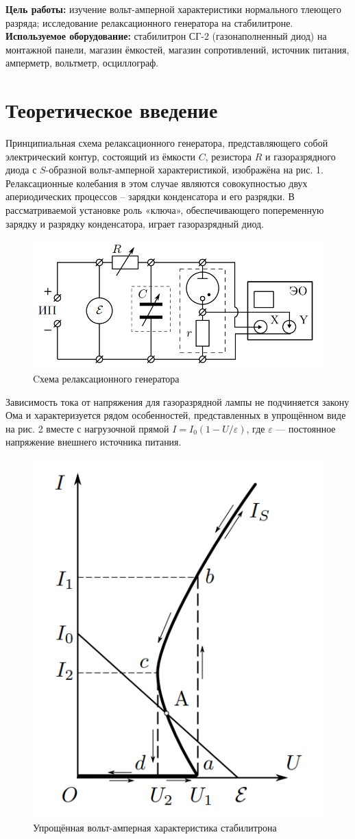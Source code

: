 \textbf{Цель работы:} изучение вольт-амперной характеристики нормального тлеющего разряда; исследование релаксационного генератора на стабилитроне. \\

\textbf{Используемое оборудование:} стабилитрон СГ-2 (газонаполненный диод) на монтажной панели, магазин ёмкостей, магазин сопротивлений, источник питания, амперметр, вольтметр, осциллограф.
                    
\section{Теоретическое введение}

Принципиальная схема релаксационного генератора, представляющего собой электрический контур, состоящий из ёмкости $C$, резистора $R$ и газоразрядного диода с $S$-образной вольт-амперной характеристикой, изображёна на рис. 1. Релаксационные колебания в этом
случае являются совокупностью двух апериодических процессов -- зарядки конденсатора и его разрядки. В рассматриваемой установке роль «ключа», обеспечивающего попеременную зарядку и разрядку конденсатора, играет газоразрядный диод.

\begin{figure}[h]
    \centering
    \includegraphics[width = 10 cm]{images/1.png}
    \caption{Cхема релаксационного генератора}
    \label{p1}
\end{figure}

Зависимость тока от напряжения для газоразрядной лампы не подчиняется закону Ома и характеризуется рядом особенностей, представленных в упрощённом виде на рис. 2 вместе с нагрузочной прямой $I = I_0 \left( 1 - U / \varepsilon \right)$, где $\varepsilon$ — постоянное напряжение внешнего источника
питания.

\begin{figure}[h]
    \centering
    \includegraphics[width = 6 cm]{images/2.png}
    \caption{Упрощённая вольт-амперная характеристика стабилитрона}
    \label{p2}
\end{figure}

